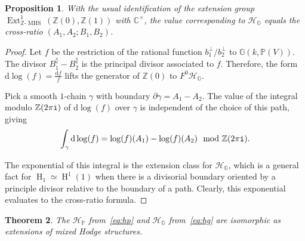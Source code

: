 \documentclass[11pt,a4paper]{amsart}
\newcommand{\C}{\mathbb{C}}
\newcommand{\G}{\mathbb{G}}
\renewcommand{\H}{\operatorname{H}}
\newcommand{\Pp}{\mathbb{P}}
\newcommand{\pv}{\mathbb{P}(V)}
\newcommand{\Z}{\mathbb{Z}}
\DeclareMathOperator{\Ext}{Ext}
\newcommand{\dd}{\mathrm{d}}
\theoremstyle{plain}
\newtheorem{theorem}{Theorem}[section]
\newtheorem{proposition}[theorem]{Proposition}
\theoremstyle{definition}
\theoremstyle{remark}
\newcommand{\tpip}{(2\pi{\tt i})}
\DeclareMathOperator{\MHS}{MHS}
\newcommand{\ZMHS}{\Z\text{-}\MHS}
\newcommand{\ch}{\mathcal{H}}
\begin{document}
\begin{proposition}\label{prop:grass_height}
With the usual identification of the extension group $\Ext^1_{\ZMHS}(\Z(0),\Z(1))$ with $\C^\times$, the value corresponding to $\ch_\G$ equals the cross-ratio $(A_1,A_2;B_1,B_2)$.
\end{proposition}
\begin{proof}
    
    Let $f$ be the restriction of the rational function $b_1^\perp / b_2^\perp$ to $\G(k,\pv)$. The divisor $B_1^\between-B_2^\between$ is the principal divisor associated to $f$. Therefore, the form $\dd \log(f) = \frac{\dd f}{f}$ lifts the generator of $\Z(0)$ to $F^0\ch_\G$. 

    Pick a smooth $1$-chain $\gamma$ with boundary $\partial \gamma = A_1 - A_2$. The value of the integral modulo $\Z \tpip$ of $\dd \log (f)$ over $\gamma$ is independent of the choice of this path, giving
    \[\int_\gamma \dd\log(f) = \log(f)(A_1) - \log(f)(A_2) \mod \Z\tpip .\]

    The exponential of this integral is the extension class for $\ch_\G$, which is a general fact for $\H_1 \simeq \H^1(1)$ when there is a divisorial boundary oriented by a principle divisor relative to the boundary of a path. Clearly, this exponential evaluates to the cross-ratio formula.
\end{proof}




\begin{theorem}\label{thm:compare_extensions}
The $\ch_\Pp$ from~\eqref{eq:hp} and $\ch_\G$ from~\eqref{eq:hg} are isomorphic as extensions of mixed Hodge structures.
\end{theorem}
\end{document}
